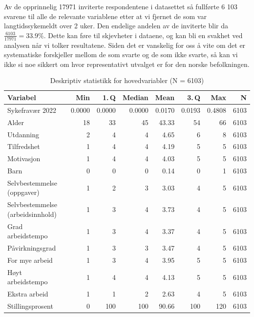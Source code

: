 \documentclass[
  12pt,
  a4paper,
  DIV=11,
  numbers=noendperiod]{scrartcl}
\begin{document}
Av de opprinnelig 17971 inviterte respondentene i datasettet så
fullførte 6 103 svarene til alle de relevante variablene etter at vi
fjernet de som var langtidssykemeldt over 2 uker. Den endelige andelen
av de inviterte blir da \(\frac{6103}{17971} = 33.9\%\). Dette kan føre
til skjevheter i dataene, og kan bli en svakhet ved analysen når vi
tolker resultatene. Siden det er vanskelig for oss å vite om det er
systematiske forskjeller mellom de som svarte og de som ikke svarte, så
kan vi ikke si noe sikkert om hvor representativt utvalget er for den
norske befolkningen.

\begin{table}[ht]
\centering
\begin{tabular}{lrrrrrrr}
\toprule
Variabel                               & Min    & 1.\,Q  & Median & Mean   & 3.\,Q  & Max    & N    \\
\midrule
Sykefravær 2022                        & 0.0000 & 0.0000 & 0.0000 & 0.0170 & 0.0193 & 0.4808 & 6103 \\
Alder                                  & 18     & 33     & 45     & 43.33  & 54     & 66     & 6103 \\
Utdanning                              & 2      & 4      & 4      & 4.65   & 6      & 8      & 6103 \\
Tilfredshet                            & 1      & 4      & 4      & 4.19   & 5      & 5      & 6103 \\
Motivasjon                             & 1      & 4      & 4      & 4.03   & 5      & 5      & 6103 \\
Barn                                   & 0      & 0      & 0      & 0.14   & 0      & 1      & 6103 \\
Selvbestemmelse (oppgaver)             & 1      & 2      & 3      & 3.03   & 4      & 5      & 6103 \\
Selvbestemmelse (arbeidsinnhold)       & 1      & 3      & 4      & 3.73   & 4      & 5      & 6103 \\
Grad arbeidstempo                      & 1      & 3      & 4      & 3.37   & 4      & 5      & 6103 \\
Påvirkningsgrad                        & 1      & 3      & 3      & 3.47   & 4      & 5      & 6103 \\
For mye arbeid                         & 1      & 3      & 4      & 3.95   & 5      & 5      & 6103 \\
Høyt arbeidstempo                      & 1      & 4      & 4      & 4.13   & 5      & 5      & 6103 \\
Ekstra arbeid                          & 1      & 1      & 2      & 2.63   & 4      & 5      & 6103 \\
Stillingsprosent                       & 0      & 100    & 100    & 90.66  & 100    & 120    & 6103 \\
\bottomrule
\end{tabular}
\caption{Deskriptiv statistikk for hovedvariabler (N = 6103)}
\label{tab:deskriptiv}
\end{table}
\end{document}
